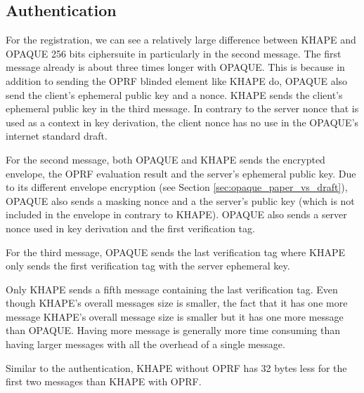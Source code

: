 \documentclass[../report.tex]{subfiles}
\begin{document}
\subsection*{Authentication}

For the registration, we can see a relatively large difference between KHAPE and OPAQUE 256 bits ciphersuite in particularly in the second message.
The first message already is about three times longer with OPAQUE. This is because in addition to sending the OPRF blinded element like KHAPE do, OPAQUE also send the client's ephemeral public key and a nonce. KHAPE sends the client's ephemeral public key in the third message.
In contrary to the server nonce that is used as a context in key derivation, the client nonce has no use in the OPAQUE's internet standard draft.

For the second message, both OPAQUE and KHAPE sends the encrypted envelope, the OPRF evaluation result and the server's ephemeral public key.
Due to its different envelope encryption (see Section \ref{sec:opaque_paper_vs_draft}), OPAQUE also sends a masking nonce and a the server's public key (which is not included in the envelope in contrary to KHAPE).
OPAQUE also sends a server nonce used in key derivation and the first verification tag.

For the third message, OPAQUE sends the last verification tag where KHAPE only sends the first verification tag with the server ephemeral key.

Only KHAPE sends a fifth message containing the last verification tag.
Even though KHAPE's overall messages size is smaller, the fact that it has one more message 
KHAPE's overall message size is smaller but it has one more message than OPAQUE. Having more message is generally more time consuming than having larger messages with all the overhead of a single message.

Similar to the authentication, KHAPE without OPRF has 32 bytes less for the first two messages than KHAPE with OPRF.





\end{document}
